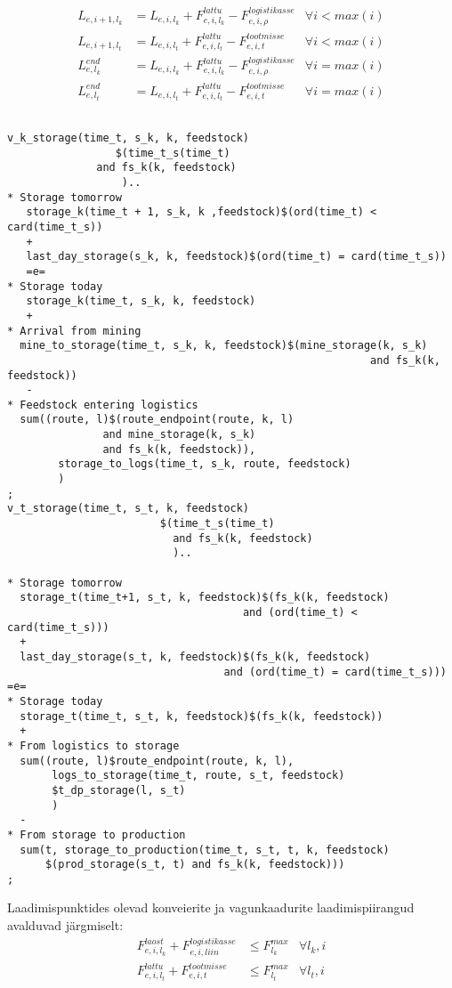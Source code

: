 \documentclass[10pt,a4paper]{article}
\begin{document}
\begin{align}
L_{e,i+1,l_k} &= L_{e,i,l_k} + F^{lattu}_{e,i,l_k} - F^{logistikasse}_{e,i,\rho} & \forall i < max(i) \\
L_{e,i+1,l_t} &= L_{e,i,l_t} + F^{lattu}_{e,i,l_t} - F^{tootmisse}_{e,i,t} & \forall i < max(i) \\
L^{end}_{e,l_k} &= L_{e,i,l_k} + F^{lattu}_{e,i,l_k} - F^{logistikasse}_{e,i,\rho} & \forall i = max(i)\\
L^{end}_{e,l_t} &= L_{e,i,l_t} + F^{lattu}_{e,i,l_t} - F^{tootmisse}_{e,i,t}  & \forall i = max(i)
\end{align}
\begin{verbatim}

v_k_storage(time_t, s_k, k, feedstock)
                 $(time_t_s(time_t)
              and fs_k(k, feedstock)
                  )..
* Storage tomorrow
   storage_k(time_t + 1, s_k, k ,feedstock)$(ord(time_t) < card(time_t_s))
   +
   last_day_storage(s_k, k, feedstock)$(ord(time_t) = card(time_t_s))
   =e=
* Storage today
   storage_k(time_t, s_k, k, feedstock)
   +
* Arrival from mining
  mine_to_storage(time_t, s_k, k, feedstock)$(mine_storage(k, s_k)
                                                         and fs_k(k, feedstock))
   -
* Feedstock entering logistics
  sum((route, l)$(route_endpoint(route, k, l)
               and mine_storage(k, s_k)
               and fs_k(k, feedstock)),
        storage_to_logs(time_t, s_k, route, feedstock)
        )
;
v_t_storage(time_t, s_t, k, feedstock)
                        $(time_t_s(time_t)
                          and fs_k(k, feedstock)
                          )..

* Storage tomorrow
  storage_t(time_t+1, s_t, k, feedstock)$(fs_k(k, feedstock) 
                                     and (ord(time_t) < card(time_t_s)))
  +
  last_day_storage(s_t, k, feedstock)$(fs_k(k, feedstock) 
                                  and (ord(time_t) = card(time_t_s)))
=e=
* Storage today
  storage_t(time_t, s_t, k, feedstock)$(fs_k(k, feedstock))
  +
* From logistics to storage
  sum((route, l)$route_endpoint(route, k, l),
       logs_to_storage(time_t, route, s_t, feedstock)
       $t_dp_storage(l, s_t)
       )
  -
* From storage to production
  sum(t, storage_to_production(time_t, s_t, t, k, feedstock)
      $(prod_storage(s_t, t) and fs_k(k, feedstock)))
;
\end{verbatim}
Laadimispunktides olevad konveierite ja vagunkaadurite laadimispiirangud avalduvad järgmiselt:
\begin{align}
F^{laost}_{e,i,l_k} + F^{logistikasse}_{e,i,liin} &\leq F^{max}_{l_k} &\forall l_k,i\\
F^{lattu}_{e,i,l_t} + F^{tootmisse}_{e,i,t} &\leq F^{max}_{l_t} &\forall l_t,i
\end{align}
\end{document}

